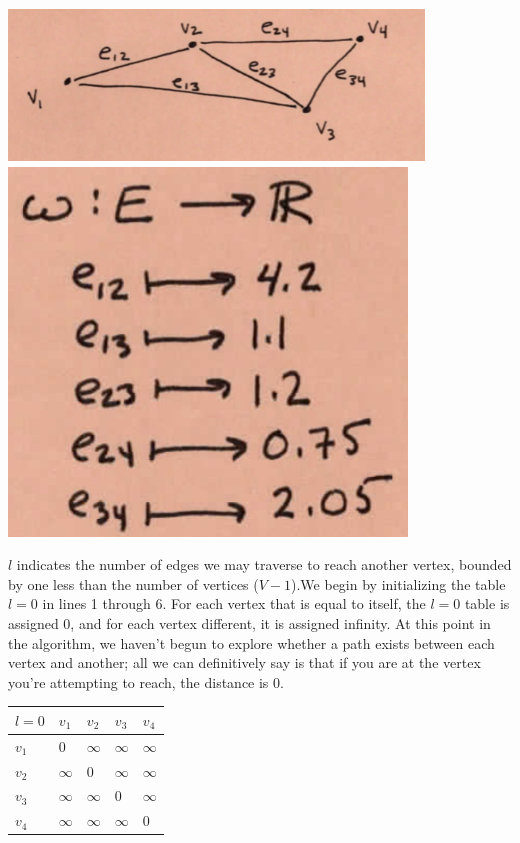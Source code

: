 \documentclass{article}
\begin{document}
\includegraphics{graph.png}
\includegraphics[scale=0.5]{weights.png}

$l$ indicates the number of edges we may traverse to reach another vertex, bounded by one less than the number of vertices ($V - 1$).We begin by initializing the table $l = 0$ in lines 1 through 6. For each vertex that is equal to itself, the $l = 0$ table is assigned 0, and for each vertex different, it is assigned infinity. At this point in the algorithm, we haven't begun to explore whether a path exists between each vertex and another; all we can definitively say is that if you are at the vertex you're attempting to reach, the distance is 0.

\begin{table}[]
\begin{tabular}{|l|l|l|l|l|}
\hline
$l = 0$  & $v_1$                  & $v_2$                  & $v_3$                  & $v_4$                  \\ \hline
$v_1$ & 0                     & $\infty$ & $\infty$ & $\infty$ \\ \hline
$v_2$ & $\infty$ & 0                     & $\infty$ & $\infty$ \\ \hline
$v_3$ & $\infty$ & $\infty$ & 0                     & $\infty$ \\ \hline
$v_4$ & $\infty$ & $\infty$ & $\infty$ & 0                     \\ \hline
\end{tabular}
\end{table}
\end{document}
